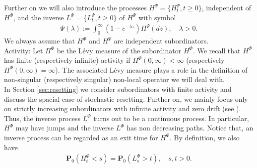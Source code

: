\documentclass[11pt,a4paper]{article}
\theoremstyle{plain}
\theoremstyle{definition}
\theoremstyle{remark}
\begin{document}
	Further on we will also introduce the processes $H^\Psi=\{H_t^\Psi, t \geq 0\}$, independent of $H^\Phi$, and the inverse $L^\Psi=\{L_t^\Psi, t \geq 0\}$ of $H^\Psi$ with symbol 
	\begin{align*}
		\Psi(\lambda):=\int_0^\infty (1-e^{-\lambda z}) \Pi^\Psi(dz), \quad \lambda >0.
	\end{align*}
	We always assume that $H^\Phi$ and $H^\Psi$ are independent subordinators.\\
	
	
	
	{ \sc Activity:} Let $\Pi^\Phi$ be the L\'{e}vy measure of the subordinator $H^\Phi$. We recall that $H^\Phi$ has finite (respectively infinite) activity if $\Pi^\Phi(0, \infty)< \infty$ (respectively $\Pi^\Phi(0, \infty) =  \infty$). The associated L\'{e}vy measure plays a role in the definition of non-singular (respectively singular) non-local operator we will deal with. \\
	
	
	In Section \ref{sec:resetting} we consider subordinators with finite activity and discuss the spacial case of stochastic resetting. Further on,  we mainly focus only on strictly increasing subordinators with infinite activity and zero drift (see \cite[Theorem 21.3]{sato1999levy}). Thus, the inverse process $L^\Phi$ turns out to be a continuous process. In particular, $H^\Phi$ may have jumps and the inverse $L^\Phi$ has non decreasing paths. Notice that, an inverse process can be regarded as an exit time for $H^\Phi$. By definition, we also have
	\begin{align}
		\label{relationHL}
		\mathbf{P}_0(H_t^\Phi < s) = \mathbf{P}_0(L_s^\Phi>t), \quad s,t>0.
	\end{align}
	
\end{document}

